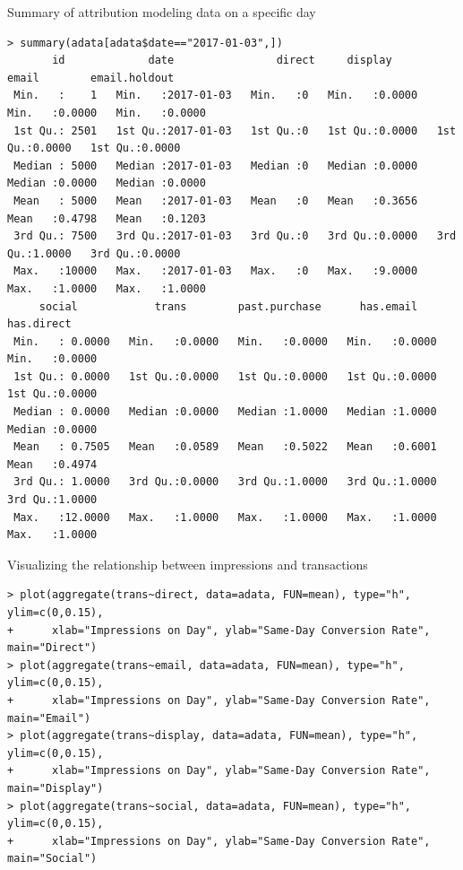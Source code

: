 \documentclass[10pt, aspectratio=169]{beamer}
\begin{document}
\begin{frame}[fragile]{Summary of attribution modeling data on a specific day}
\footnotesize
\begin{lstlisting}[basicstyle=\tiny\ttfamily]
> summary(adata[adata$date=="2017-01-03",])
       id             date                direct     display           email        email.holdout   
 Min.   :    1   Min.   :2017-01-03   Min.   :0   Min.   :0.0000   Min.   :0.0000   Min.   :0.0000  
 1st Qu.: 2501   1st Qu.:2017-01-03   1st Qu.:0   1st Qu.:0.0000   1st Qu.:0.0000   1st Qu.:0.0000  
 Median : 5000   Median :2017-01-03   Median :0   Median :0.0000   Median :0.0000   Median :0.0000  
 Mean   : 5000   Mean   :2017-01-03   Mean   :0   Mean   :0.3656   Mean   :0.4798   Mean   :0.1203  
 3rd Qu.: 7500   3rd Qu.:2017-01-03   3rd Qu.:0   3rd Qu.:0.0000   3rd Qu.:1.0000   3rd Qu.:0.0000  
 Max.   :10000   Max.   :2017-01-03   Max.   :0   Max.   :9.0000   Max.   :1.0000   Max.   :1.0000  
     social            trans        past.purchase      has.email        has.direct    
 Min.   : 0.0000   Min.   :0.0000   Min.   :0.0000   Min.   :0.0000   Min.   :0.0000  
 1st Qu.: 0.0000   1st Qu.:0.0000   1st Qu.:0.0000   1st Qu.:0.0000   1st Qu.:0.0000  
 Median : 0.0000   Median :0.0000   Median :1.0000   Median :1.0000   Median :0.0000  
 Mean   : 0.7505   Mean   :0.0589   Mean   :0.5022   Mean   :0.6001   Mean   :0.4974  
 3rd Qu.: 1.0000   3rd Qu.:0.0000   3rd Qu.:1.0000   3rd Qu.:1.0000   3rd Qu.:1.0000  
 Max.   :12.0000   Max.   :1.0000   Max.   :1.0000   Max.   :1.0000   Max.   :1.0000  
\end{lstlisting}
\end{frame}

\begin{frame}[fragile]{Visualizing the relationship between impressions and transactions}
\footnotesize
\begin{lstlisting}
> plot(aggregate(trans~direct, data=adata, FUN=mean), type="h", ylim=c(0,0.15),
+      xlab="Impressions on Day", ylab="Same-Day Conversion Rate", main="Direct")
> plot(aggregate(trans~email, data=adata, FUN=mean), type="h", ylim=c(0,0.15),
+      xlab="Impressions on Day", ylab="Same-Day Conversion Rate", main="Email")
> plot(aggregate(trans~display, data=adata, FUN=mean), type="h", ylim=c(0,0.15),
+      xlab="Impressions on Day", ylab="Same-Day Conversion Rate", main="Display")
> plot(aggregate(trans~social, data=adata, FUN=mean), type="h", ylim=c(0,0.15),
+      xlab="Impressions on Day", ylab="Same-Day Conversion Rate", main="Social")
\end{lstlisting}
\end{frame}
\end{document}
